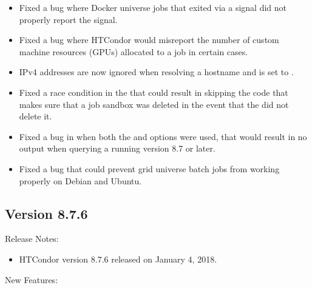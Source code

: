 \begin{itemize}

\item Fixed a bug where Docker universe jobs that exited via a signal
did not properly report the signal.

\item Fixed a bug where HTCondor would misreport the number of custom
machine resources (GPUs) allocated to a job in certain cases.

\item IPv4 addresses are now ignored when resolving a hostname and
 is set to .

\item Fixed a race condition in the  that could result in skipping the
code that makes sure that a job sandbox was deleted in the event that the  did
not delete it.

\item Fixed a bug in  when both the  and  options were used, that would
result in no output when querying a  running version 8.7 or later.

\item Fixed a bug that could prevent grid universe batch jobs from working
properly on Debian and Ubuntu.

\end{itemize}

\subsection*{\label{sec:New-8-7-6}Version 8.7.6}

\noindent Release Notes:

\begin{itemize}

\item HTCondor version 8.7.6 released on January 4, 2018.

\end{itemize}


\noindent New Features:

